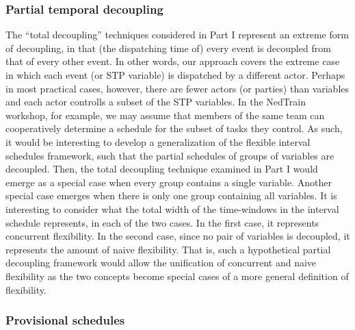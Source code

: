 	\subsubsection*{Partial temporal decoupling}
	
	The ``total decoupling'' techniques considered in Part I represent an extreme form of decoupling,
	in that (the dispatching time of) every event is decoupled from that of every other event.
	In other words, our approach covers the extreme case in which each event (or STP variable) is dispatched by a different actor.
	Perhaps in most practical cases, however, there are fewer actors (or parties) than variables
	and each actor controlls a subset of the STP variables.
	In the NedTrain workshop, for example, we may assume that members of the same team 
	can cooperatively determine a schedule for the subset of tasks they control.
	As such, it would be interesting to develop a generalization of the flexible interval schedules framework,
 	such that the partial schedules of groups of variables are decoupled.
	Then, the total decoupling technique examined in Part I would emerge as a special case when every group contains a single variable.
	Another special case emerges when there is only one group containing all variables.
	It is interesting to consider what the total width of the time-windows in the interval schedule represents, in each of the two cases. 
	In the first case, it represents concurrent flexibility.
	In the second case, since no pair of variables is decoupled, it represents the amount of naive flexibility.
	That is, such a hypothetical partial decoupling framework would allow the unification of concurrent and naive flexibility
	as the two concepts become special cases of a more general definition of flexibility.

	\subsubsection*{Provisional schedules}
	
